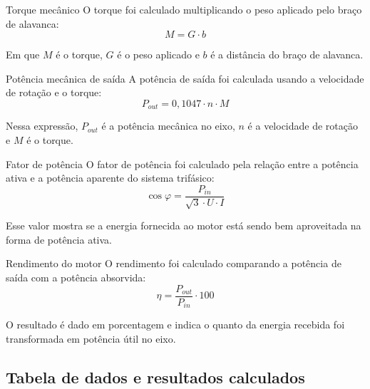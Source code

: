 \documentclass[12pt,a4paper]{article}
\begin{document}
\begin{caixacalculo}{Torque mecânico}
O torque foi calculado multiplicando o peso aplicado pelo braço de alavanca:
\begin{equation*}
M=G\cdot b
\end{equation*}

Em que $M$ é o torque, $G$ é o peso aplicado e $b$ é a distância do braço de alavanca.
\end{caixacalculo}

\begin{caixacalculo}{Potência mecânica de saída}
A potência de saída foi calculada usando a velocidade de rotação e o torque:
\begin{equation*}
P_{out}=0{,}1047\cdot n\cdot M
\end{equation*}

Nessa expressão, $P_{out}$ é a potência mecânica no eixo, $n$ é a velocidade de rotação e $M$ é o torque.
\end{caixacalculo}

\begin{caixacalculo}{Fator de potência}
O fator de potência foi calculado pela relação entre a potência ativa e a potência aparente do sistema trifásico:
\begin{equation*}
\cos\varphi=\frac{P_{in}}{\sqrt{3}\cdot U\cdot I}
\end{equation*}

Esse valor mostra se a energia fornecida ao motor está sendo bem aproveitada na forma de potência ativa.
\end{caixacalculo}

\begin{caixacalculo}{Rendimento do motor}
O rendimento foi calculado comparando a potência de saída com a potência absorvida:
\begin{equation*}
\eta=\frac{P_{out}}{P_{in}}\cdot100
\end{equation*}

O resultado é dado em porcentagem e indica o quanto da energia recebida foi transformada em potência útil no eixo.
\end{caixacalculo}

\subsection{Tabela de dados e resultados calculados}
\end{document}
